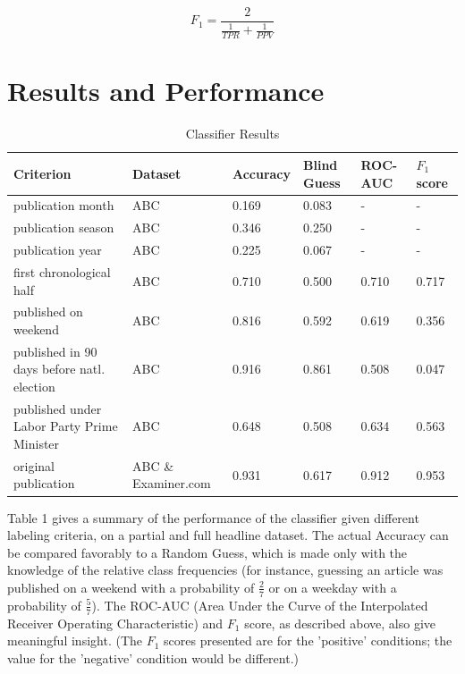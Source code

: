 \documentclass[format=acmlarge]{acmart}
\begin{document}
$$F_1 = \frac{2}{\frac{1}{\mathit{TPR}} + \frac{1}{\mathit{PPV}}}$$

\section{Results and Performance}

\begin{table}
  \caption{Classifier Results}
  \label{tab:one}
  \begin{tabular}{|p{10em}|l|l|l|l|l|}
    \hline
    Criterion & Dataset & Accuracy & Blind Guess & ROC-AUC & $F_1$ score\\
    \hline
    publication month & ABC & 0.169 & 0.083 & - & -\\
    \hline
    publication season & ABC & 0.346 & 0.250 & - & -\\
    \hline
    publication year & ABC & 0.225 & 0.067 & - & -\\
    \hline
    first chronological half & ABC & 0.710 & 0.500 & 0.710 & 0.717\\
    \hline
    published on weekend & ABC & 0.816 & 0.592 & 0.619 & 0.356\\
    \hline
    published in 90 days \newline before natl. election & ABC  & 0.916 & 0.861 & 0.508 & 0.047\\
    \hline
    published under Labor \newline Party Prime Minister & ABC  & 0.648 & 0.508 & 0.634 & 0.563\\
    \hline
    original publication & ABC \& Examiner.com & 0.931 & 0.617 & 0.912 & 0.953\\
    \hline
  \end{tabular}
\end{table}

Table 1 gives a summary of the performance of the classifier given different labeling criteria, on a partial and full headline dataset.  The actual Accuracy can be compared favorably to a Random Guess, which is made only with the knowledge of the relative class frequencies (for instance, guessing an article was published on a weekend with a probability of $\frac{2}{7}$ or on a weekday with a probability of $\frac{5}{7}$).  The ROC-AUC (Area Under the Curve of the Interpolated Receiver Operating Characteristic) and $F_1$ score, as described above, also give meaningful insight.  (The $F_1$ scores presented are for the 'positive' conditions; the value for the 'negative' condition would be different.)
\end{document}
